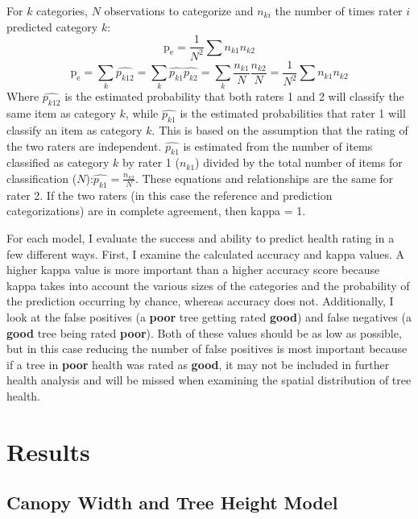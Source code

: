 \documentclass[12pt,twoside]{reedthesis}
\begin{document}
For \(k\) categories, \(N\) observations to categorize and \(n_{ki}\) the
number of times rater \(i\) predicted category \(k\):
\begin{equation}
\mathrm{p_e} = \frac{1}{N^2}\sum{n_{k1}n_{k2}}
\end{equation}
\begin{equation}
  \mathrm{p_e} = \sum_{k}\widehat{p_{k12}} = \sum_{k} \widehat{p_{k1}}\widehat{p_{k2}} = \sum_{k}\frac{n_{k1}}{N}\frac{n_{k2}}{N} =            \frac{1}{N^2}\sum{n_{k1}n_{k2}}
\end{equation}
Where \(\widehat{p_{k12}}\) is the estimated probability that both raters
1 and 2 will classify the same item as category \(k\), while
\(\widehat{p_{k1}}\) is the estimated probabilities that rater 1 will
classify an item as category \(k\). This is based on the assumption that
the rating of the two raters are independent. \(\widehat{p_{k1}}\) is
estimated from the number of items classified as category \(k\) by rater 1
(\(n_{k1}\)) divided by the total number of items for classification
(\(N\)):\(\widehat{p_{k1}}=\frac{n_{k2}}{N}\). These equations and
relationships are the same for rater 2. If the two raters (in this case
the reference and prediction categorizations) are in complete agreement,
then kappa = 1.

For each model, I evaluate the success and ability to predict health
rating in a few different ways. First, I examine the calculated accuracy
and kappa values. A higher kappa value is more important than a higher
accuracy score because kappa takes into account the various sizes of the
categories and the probability of the prediction occurring by chance,
whereas accuracy does not. Additionally, I look at the false positives
(a \textbf{poor} tree getting rated \textbf{good}) and false negatives (a \textbf{good}
tree being rated \textbf{poor}). Both of these values should be as low as
possible, but in this case reducing the number of false positives is
most important because if a tree in \textbf{poor} health was rated as
\textbf{good}, it may not be included in further health analysis and will be
missed when examining the spatial distribution of tree health.

\hypertarget{results}{%
\chapter{Results}\label{results}}

\hypertarget{canopy-model-results}{%
\section{Canopy Width and Tree Height Model}\label{canopy-model-results}}
\end{document}
